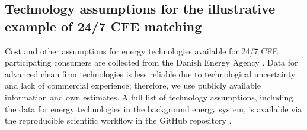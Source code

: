 \documentclass[pdflatex,sn-basic, Numbered]{sn-jnl}
\theoremstyle{thmstyleone}%
\theoremstyle{thmstyletwo}%
\theoremstyle{thmstylethree}%
\begin{document}


\FloatBarrier
\newpage

\subsection*{Technology assumptions for the illustrative example of 24/7 CFE matching}
\label{sec:annex}

Cost and other assumptions for energy technologies available for 24/7 CFE participating consumers are collected from the Danish Energy Agency \cite{DEA-technologydata}.
Data for advanced clean firm technologies is less reliable due to technological uncertainty and lack of commercial experience; therefore, we use publicly available information and own estimates.
A full list of technology assumptions, including the data for energy technologies in the background energy system, is available via the reproducible scientific workflow in the GitHub repository \cite{code247CFE}.
\end{document}
